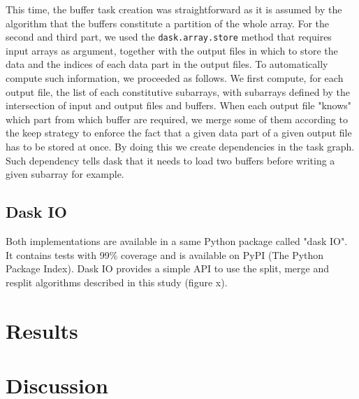 \documentclass[conference]{IEEEtran}
\begin{document}
This time, the buffer task creation was straightforward as it is assumed by the
algorithm that the buffers constitute a partition of the whole array. For the
second and third part, we used the \texttt{dask.array.store} method that
requires input arrays as argument, together with the output files in which to
store the data and the indices of each data part in the output files. To
automatically compute such information, we proceeded as follows. We first
compute, for each output file, the list of each constitutive subarrays, with
subarrays defined by the intersection of input and output files and buffers.
When each output file "knows" which part from which buffer are required, we
merge some of them according to the keep strategy to enforce the fact that
a given data part of a given output file has to be stored at once. By doing this
we create dependencies in the task graph. Such dependency tells dask that it
needs to load two buffers before writing a given subarray for example.

\subsection{Dask IO}

Both implementations are available in a same Python package called "dask IO". It
contains tests with 99\% coverage and is available on PyPI (The Python Package
Index). Dask IO provides a simple API to use the split, merge and resplit
algorithms described in this study (figure x).

\section{Results}

\section{Discussion}
\end{document}
